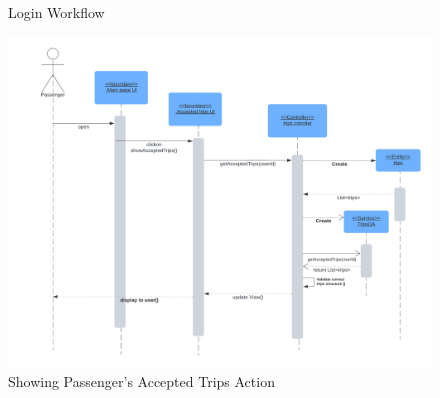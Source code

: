 \documentclass[a4paper, 12pt]{article} %
\begin{document}
        \begin{figure}[h]
            \centering
            \caption{Login Workflow}
            \label{fig:seq_dig_login}
        \end{figure}



        \begin{figure}
            \centering
            \includegraphics[width=\linewidth]{Images/Passenger Accepted.png}
            \caption{Showing Passenger's Accepted Trips Action}
            \label{fig:seq_dig_pass_accepted}
        \end{figure}
\end{document}
